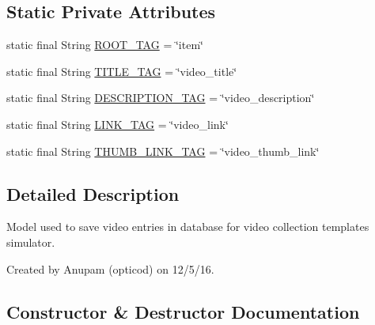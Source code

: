 \subsection*{Static Private Attributes}
\begin{DoxyCompactItemize}
\item 
static final String \hyperlink{classorg_1_1buildmlearn_1_1toolkit_1_1videocollectiontemplate_1_1data_1_1VideoModel_ae5ea97ba309bececb6d41a7fbca921c2}{R\+O\+O\+T\+\_\+\+T\+AG} = \char`\"{}item\char`\"{}
\item 
static final String \hyperlink{classorg_1_1buildmlearn_1_1toolkit_1_1videocollectiontemplate_1_1data_1_1VideoModel_a5615a39b6f341a11869ca7749ab8fdb4}{T\+I\+T\+L\+E\+\_\+\+T\+AG} = \char`\"{}video\+\_\+title\char`\"{}
\item 
static final String \hyperlink{classorg_1_1buildmlearn_1_1toolkit_1_1videocollectiontemplate_1_1data_1_1VideoModel_a90339166f383e5a244d046e6a3191bd1}{D\+E\+S\+C\+R\+I\+P\+T\+I\+O\+N\+\_\+\+T\+AG} = \char`\"{}video\+\_\+description\char`\"{}
\item 
static final String \hyperlink{classorg_1_1buildmlearn_1_1toolkit_1_1videocollectiontemplate_1_1data_1_1VideoModel_aa46c4cd8515fdb21148e2a12965d5128}{L\+I\+N\+K\+\_\+\+T\+AG} = \char`\"{}video\+\_\+link\char`\"{}
\item 
static final String \hyperlink{classorg_1_1buildmlearn_1_1toolkit_1_1videocollectiontemplate_1_1data_1_1VideoModel_a8f7b0e877c6e012aba7aec6033029c60}{T\+H\+U\+M\+B\+\_\+\+L\+I\+N\+K\+\_\+\+T\+AG} = \char`\"{}video\+\_\+thumb\+\_\+link\char`\"{}
\end{DoxyCompactItemize}


\subsection{Detailed Description}
Model used to save video entries in database for video collection template\textquotesingle{}s simulator. 

Created by Anupam (opticod) on 12/5/16. 

\subsection{Constructor \& Destructor Documentation}

